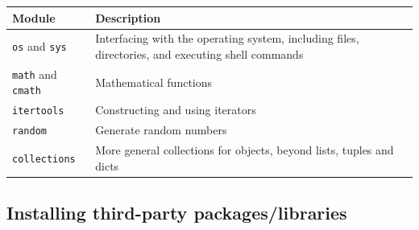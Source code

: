 \documentclass[
  letterpaper,
]{scrbook}
\begin{document}
\begin{longtable}[]{@{}ll@{}}
\toprule
\begin{minipage}[b]{0.22\columnwidth}\raggedright
Module\strut
\end{minipage} & \begin{minipage}[b]{0.72\columnwidth}\raggedright
Description\strut
\end{minipage}\tabularnewline
\midrule
\endhead
\begin{minipage}[t]{0.22\columnwidth}\raggedright
\texttt{os} and \texttt{sys}\strut
\end{minipage} & \begin{minipage}[t]{0.72\columnwidth}\raggedright
Interfacing with the operating system, including files, directories, and executing shell commands\strut
\end{minipage}\tabularnewline
\begin{minipage}[t]{0.22\columnwidth}\raggedright
\texttt{math} and \texttt{cmath}\strut
\end{minipage} & \begin{minipage}[t]{0.72\columnwidth}\raggedright
Mathematical functions\strut
\end{minipage}\tabularnewline
\begin{minipage}[t]{0.22\columnwidth}\raggedright
\texttt{itertools}\strut
\end{minipage} & \begin{minipage}[t]{0.72\columnwidth}\raggedright
Constructing and using iterators\strut
\end{minipage}\tabularnewline
\begin{minipage}[t]{0.22\columnwidth}\raggedright
\texttt{random}\strut
\end{minipage} & \begin{minipage}[t]{0.72\columnwidth}\raggedright
Generate random numbers\strut
\end{minipage}\tabularnewline
\begin{minipage}[t]{0.22\columnwidth}\raggedright
\texttt{collections}\strut
\end{minipage} & \begin{minipage}[t]{0.72\columnwidth}\raggedright
More general collections for objects, beyond lists, tuples and dicts\strut
\end{minipage}\tabularnewline
\bottomrule
\end{longtable}

\hypertarget{installing-third-party-packageslibraries}{%
\subsection{Installing third-party packages/libraries}\label{installing-third-party-packageslibraries}}
\end{document}
